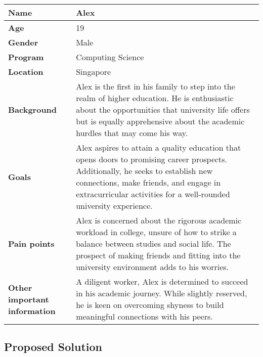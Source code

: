 \begin{center}
\begin{longtable}{|l|p{10cm}|}
\hline
\textbf{Name} & Alex \\
\hline
\textbf{Age} & 19 \\
\hline
\textbf{Gender} & Male \\
\hline
\textbf{Program} & Computing Science \\
\hline
\textbf{Location} & Singapore \\
\hline
\textbf{Background} & Alex is the first in his family to step into the realm of higher education. He is enthusiastic about the opportunities that university life offers but is equally apprehensive about the academic hurdles that may come his way. \\
\hline
\textbf{Goals} & Alex aspires to attain a quality education that opens doors to promising career prospects. Additionally, he seeks to establish new connections, make friends, and engage in extracurricular activities for a well-rounded university experience. \\
\hline
\textbf{Pain points} & Alex is concerned about the rigorous academic workload in college, unsure of how to strike a balance between studies and social life. The prospect of making friends and fitting into the university environment adds to his worries. \\
\hline
\textbf{Other important information} & A diligent worker, Alex is determined to succeed in his academic journey. While slightly reserved, he is keen on overcoming shyness to build meaningful connections with his peers. \\
\hline
\end{longtable}
\end{center}


\subsection{Proposed Solution}\label{proposed_solution}
